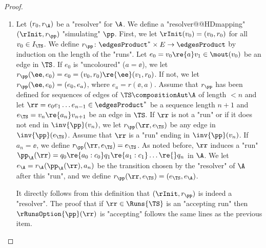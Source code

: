 \documentclass{theoretics}
\begin{document}
\begin{proof}
\begin{enumerate}
		Let $\rr$ be a "rejecting run" in $\TS\compositionAut \A$ (we use the notations introduced above). In that case, $c_0c_1c_2\dots \notin \WW_\A$, and therefore $\pp_\A(\rr)$ is a "rejecting run" over $a_0a_1a_2\dots$. Since $\A$ is "deterministic", this is the only "run over" $a_0a_1a_2\dots$, so we conclude that it does not belong to $\WW.$ We conclude that $\ppRuns(\rr)$ is a "rejecting run" in $\TS$.
		
		\item Let $(r_0, r_\A)$ be a "resolver" for $\A$. We define a "resolver@@HDmapping" $(\rInit, r_\pp)$ "simulating" $\pp$. First, we let $\rInit(v_0) = (v_0,r_0)$ for all $v_0\in I_\TS$. We define $r_\pp\colon {\edgesProduct}^*\times E \to \edgesProduct$ by induction on the length of the "runs". 
		Let $e_0 = v_0\re{a}v_1\in \mout(v_0)$ be an edge in $\TS$. If $e_0$ is "uncoloured" ($a=\ee$), we let $r_\pp(\ee, e_0) = e_0 = (v_0,r_0)\re{\ee}(v_1,r_0)$. If not, we let $r_\pp(\ee, e_0) = (e_0, e_a)$, where $e_a = r(\ee,a)$. 
		Assume that $r_\pp$ has been defined for sequences of edges of $\TS \compositionAut \A$ of length $< n$ and let  $\rr =e_0e_1\dots e_{n-1}\in {\edgesProduct}^*$ be a sequence length $n+1$ and $e_\TS = v_n\re{a_n} v_{n+1}$ be an edge in $\TS$.
		If $\rr$ is not a "run" or if it does not end in $\inv{\pp}(v_n)$, we let $r_\pp(\rr, e_\TS)$ be any edge in $\inv{\pp}(e_\TS)$.
		Assume that $\rr$ is a "run" ending in $\inv{\pp}(v_n)$. If $a_n = \ee$, we define $r_\pp(\rr, e_\TS) = e_\TS$. As noted before, $\rr$ induces a "run" $\pp_\A(\rr) = q_0 \re{a_0:c_0}  q_1 \re{a_1:c_1} \dots \re{}q_n$ in $\A$. We let $e_\A = r_\A(\pp_\A(\rr), a_n)$ be the transition chosen by the "resolver" of $\A$ after this "run",  and we define $r_\pp(\rr, e_\TS) = (e_\TS, e_\A)$.
		
		It directly follows from this definition that $(\rInit, r_\pp)$ is indeed a "resolver". The proof that if $\rr\in \Runs{\TS}$ is an "accepting run" then $\rRunsOption{\pp}(\rr)$ is "accepting" follows the same lines as the previous item.
		

\end{enumerate}
\end{proof}
\end{document}
